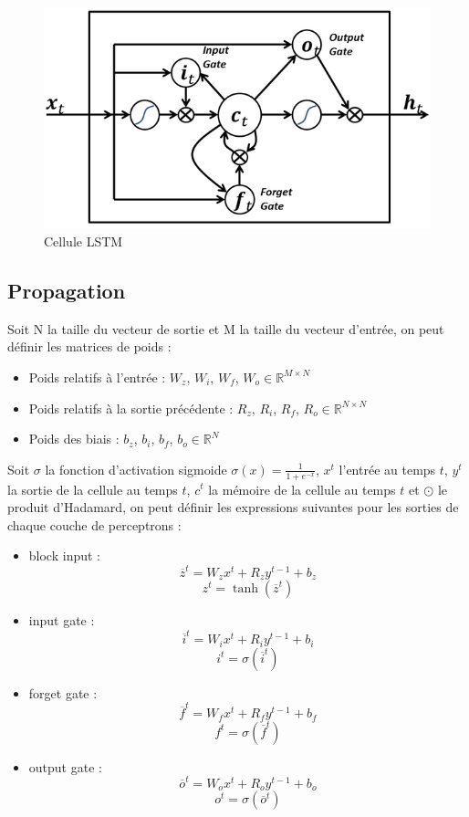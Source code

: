 \begin{figure}[!ht]
\begin{center}
\includegraphics[width=0.6\linewidth]{images/lstm.png}
\end{center}
\caption{Cellule LSTM}
\end{figure}

\subsection{Propagation}

Soit N la taille du vecteur de sortie et M la taille du vecteur d'entrée, on
peut définir les matrices de poids :

\begin{itemize}
  \item Poids relatifs à l'entrée : $W_z$, $W_i$, $W_f$,
    $W_o \in \mathbb{R}^{M \times N}$
  \item Poids relatifs à la sortie précédente : $R_z$, $R_i$, $R_f$,
    $R_o \in \mathbb{R}^{N \times N}$
  \item Poids des biais : $b_z$, $b_i$, $b_f$,
    $b_o \in \mathbb{R}^N$
\end{itemize}

Soit $\sigma$ la fonction d'activation sigmoide $\sigma(x)=\frac{1}{1+e^{-x}}$,
$x^t$ l'entrée au temps $t$, $y^t$ la sortie de la cellule au temps $t$, $c^t$
la mémoire de la cellule au temps $t$ et $\odot$ le produit d'Hadamard,
on peut définir les expressions suivantes pour les sorties de chaque couche de
perceptrons :

\medskip

\begin{itemize}
  \item block input :
    $$\overline{z}^t = W_z x^t + R_z y^{t-1} + b_z$$
    $$z^t = \tanh(\overline{z}^t)$$
  \item input gate :
    $$\overline{i}^t = W_i x^t + R_i y^{t-1} + b_i$$
    $$i^t = \sigma(\overline{i}^t)$$
  \item forget gate :
    $$\overline{f}^t = W_f x^t + R_f y^{t-1} + b_f$$
    $$f^t = \sigma(\overline{f}^t)$$
  \item output gate :
    $$\overline{o}^t = W_o x^t + R_o y^{t-1} + b_o$$
    $$o^t = \sigma(\overline{o}^t)$$
\end{itemize}


